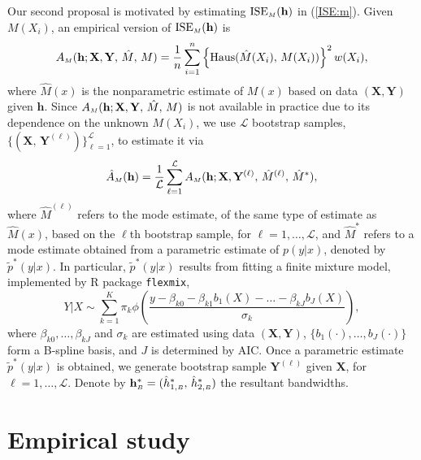\documentclass[fleqn,12pt,twoside]{article}
\newcommand{\calL}{\mathcal{L}}
\newcommand{\ISE}{\mathrm{ISE}}
\newcommand{\Haus}{\mathrm{Haus}}
\newcommand{\bh}{\mathbf{h}}
\newcommand{\bX}{\mathbf{X}}
\newcommand{\bY}{\mathbf{Y}}
\numberwithin{equation}{section}
\begin{document}
Our second proposal is motivated by estimating $\ISE_{\hbox {\tiny $M$}}(\bh)$ in (\ref{ISE:m}). Given $M(X_i)$, an empirical version of $\ISE_{\hbox {\tiny {$M$}}}(\bh)$ is 
\[ A_{\hbox {\tiny $M$}}(\bh; \bX, \bY, \, \hat{M}, \, M) = \frac{1}{n} \sum_{i=1}^{n} \left\{ \Haus(\hat{M}(X_i), \,{M}(X_i)) \right\}^2w(X_i),
\]
where $\hat{M}(x)$ is the nonparametric estimate of $M(x)$ based on data $(\bX, \bY)$ given $\bh$. Since $A_{\hbox {\tiny $M$}}(\bh; \bX, \bY, \, \hat{M}, \, M)$ is not available in practice due to its dependence on the unknown $M(X_i)$, we use $\calL$ bootstrap samples, $\{(\bX,\, \bY^{(\ell)})\}_{\ell=1}^\calL$, to estimate it via
\begin{equation}\label{bootstrap:m}
\hat A_{\hbox {\tiny $M$}}(\bh) = \frac{1}{\calL} \sum_{\ell=1}^{\calL} A_{\hbox {\tiny $M$}}(\bh; \bX, \bY^{(\ell)}, \, \hat{M}^{(\ell)}, \, \hat M^*),
\end{equation}
where $\hat{M}^{(\ell)}$ refers to the mode estimate, of the same type of estimate as $\hat M(x)$, based on the $\ell$th bootstrap sample, for $\ell=1, \ldots, \calL$, and $\hat M^*$ refers to a mode estimate obtained from a parametric estimate of $p(y|x)$, denoted by $\tilde p^*(y|x)$. In particular, $\tilde p^*(y|x)$ results from fitting a finite mixture model, implemented by R package \texttt{flexmix},
\[ Y|X\sim \sum_{k=1}^{K}\pi_k \phi
\left(\frac{y-\beta_{k0}-\beta_{k1}b_1(X)-\ldots-\beta_{kJ}b_J(X)}{\sigma_k}\right),
\]
where $\beta_{k0}, \ldots, \beta_{kJ}$ and $\sigma_k$ are estimated using data $(\bX, \bY)$, $\{b_1(\cdot), \ldots, b_J(\cdot)\}$ form a B-spline basis, and $J$ is determined by AIC. Once a parametric estimate $\tilde{p}^*(y|x)$ is obtained, we generate bootstrap sample $\bY^{(\ell)}$ given $\bX$, for $\ell=1, \ldots, \calL$. Denote by $\bh^*_{\hbox {\tiny $B$}}=(\hat h^*_{1, \hbox {\tiny $B$}}, \, \hat h^*_{2, \hbox {\tiny $B$}})$ the resultant bandwidths. 

\section{Empirical study}
\label{s:simulation}
\end{document}
